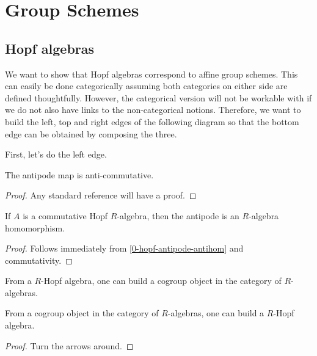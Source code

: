 \section{Group Schemes}


\subsection{Hopf algebras}


We want to show that Hopf algebras correspond to affine group schemes. This can easily be done
categorically assuming both categories on either side are defined thoughtfully. However, the
categorical version will not be workable with if we do not also have links to the non-categorical
notions. Therefore, we want to build the left, top and right edges of the following diagram so that
the bottom edge can be obtained by composing the three.


First, let's do the left edge.


\begin{proposition}
  \label{0-hopf-antipode-antihom}
  \uses{}

  The antipode map is anti-commutative.
\end{proposition}
\begin{proof}
  \uses{}

  Any standard reference will have a proof.
\end{proof}


\begin{proposition}
  \label{0-commhopf-antipode-hom}
  \uses{}

  If $A$ is a commutative Hopf $R$-algebra, then the antipode is an $R$-algebra homomorphism.
\end{proposition}
\begin{proof}

  Follows immediately from \ref{0-hopf-antipode-antihom} and commutativity.
\end{proof}


\begin{proposition}
  \label{0-hopf-cogrp-alg}

  From a $R$-Hopf algebra, one can build a cogroup object in the category of $R$-algebras.

  From a cogroup object in the category of $R$-algebras, one can build a $R$-Hopf algebra.
\end{proposition}
\begin{proof}
  \uses{}

  Turn the arrows around.
\end{proof}


